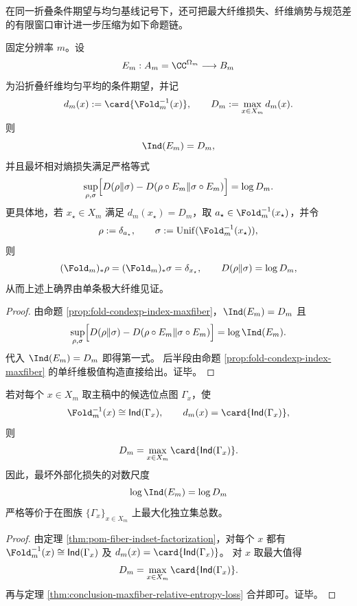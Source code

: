 在同一折叠条件期望与均匀基线记号下，还可把最大纤维损失、纤维熵势与规范差的有限窗口审计进一步压缩为如下命题链。

\begin{theorem}[最大纤维给出最坏外部化损失]\label{thm:conclusion-maxfiber-relative-entropy-loss}
固定分辨率 \(m\)。设
\[
E_m:A_m=\CC^{\Omega_m}\longrightarrow B_m
\]
为沿折叠纤维均匀平均的条件期望，并记
\[
d_m(x):=\card{\Fold_m^{-1}(x)},
\qquad
D_m:=\max_{x\in X_m}d_m(x).
\]
则
\[
\Ind(E_m)=D_m,
\]
并且最坏相对熵损失满足严格等式
\[
\sup_{\rho,\sigma}
\Bigl[
D(\rho\Vert\sigma)-D(\rho\circ E_m\Vert \sigma\circ E_m)
\Bigr]
=
\log D_m.
\]
更具体地，若 \(x_\star\in X_m\) 满足 \(d_m(x_\star)=D_m\)，取 \(a_\star\in \Fold_m^{-1}(x_\star)\)，并令
\[
\rho:=\delta_{a_\star},
\qquad
\sigma:=\mathrm{Unif}(\Fold_m^{-1}(x_\star)),
\]
则
\[
(\Fold_m)_\ast\rho=(\Fold_m)_\ast\sigma=\delta_{x_\star},
\qquad
D(\rho\Vert\sigma)=\log D_m,
\]
从而上述上确界由单条极大纤维见证。
\end{theorem}
\begin{proof}
由命题 \ref{prop:fold-condexp-index-maxfiber}，\(\Ind(E_m)=D_m\) 且
\[
\sup_{\rho,\sigma}
\Bigl[
D(\rho\Vert\sigma)-D(\rho\circ E_m\Vert \sigma\circ E_m)
\Bigr]
=
\log \Ind(E_m).
\]
代入 \(\Ind(E_m)=D_m\) 即得第一式。
后半段由命题 \ref{prop:fold-condexp-index-maxfiber} 的单纤维极值构造直接给出。证毕。
\end{proof}

\begin{corollary}[最坏损失的图论归约]\label{cor:conclusion-maxfiber-loss-independent-set-reduction}
若对每个 \(x\in X_m\) 取主稿中的候选位点图 \(\Gamma_x\)，使
\[
\Fold_m^{-1}(x)\cong \mathsf{Ind}(\Gamma_x),
\qquad
d_m(x)=\card{\mathsf{Ind}(\Gamma_x)},
\]
则
\[
D_m=\max_{x\in X_m}\card{\mathsf{Ind}(\Gamma_x)}.
\]
因此，最坏外部化损失的对数尺度
\[
\log \Ind(E_m)=\log D_m
\]
严格等价于在图族 \(\{\Gamma_x\}_{x\in X_m}\) 上最大化独立集总数。
\end{corollary}
\begin{proof}
由定理 \ref{thm:pom-fiber-indset-factorization}，对每个 \(x\) 都有
\(
\Fold_m^{-1}(x)\cong \mathsf{Ind}(\Gamma_x)
\)
及
\(
d_m(x)=\card{\mathsf{Ind}(\Gamma_x)}
\)。
对 \(x\) 取最大值得
\[
D_m=\max_{x\in X_m}\card{\mathsf{Ind}(\Gamma_x)}.
\]
再与定理 \ref{thm:conclusion-maxfiber-relative-entropy-loss} 合并即可。证毕。
\end{proof}

